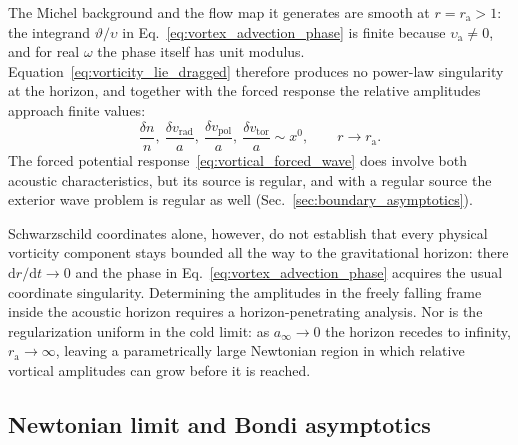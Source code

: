 \documentclass[12pt,a4paper,preprint,nopreprintline]{elsarticle}
\begin{document}
The Michel background and the flow map it generates are smooth at $r=r_{\mathrm{a}}>1$: the integrand $\vartheta/\upsilon$ in Eq.~\eqref{eq:vortex_advection_phase} is finite because $\upsilon_{\mathrm{a}}\neq0$, and for real $\omega$ the phase itself has unit modulus. Equation~\eqref{eq:vorticity_lie_dragged} therefore produces no power-law singularity at the horizon, and together with the forced response the relative amplitudes approach finite values:
\begin{equation}
    \frac{\delta n}{n},\
    \frac{\delta v_{\mathrm{rad}}}{a},\
    \frac{\delta v_{\mathrm{pol}}}{a},\
    \frac{\delta v_{\mathrm{tor}}}{a}
    \sim x^{0},
    \qquad
    r \rightarrow r_{\mathrm{a}}.
    \label{eq:michel_vortex_horizon_asymptotics}
\end{equation}
The forced potential response~\eqref{eq:vortical_forced_wave} does involve both acoustic characteristics, but its source is regular, and with a regular source the exterior wave problem is regular as well (Sec.~\ref{sec:boundary_asymptotics}).

Schwarzschild coordinates alone, however, do not establish that every physical vorticity component stays bounded all the way to the gravitational horizon: there $\mathrm{d}r/\mathrm{d}t\rightarrow0$ and the phase in Eq.~\eqref{eq:vortex_advection_phase} acquires the usual coordinate singularity. Determining the amplitudes in the freely falling frame inside the acoustic horizon requires a horizon-penetrating analysis. Nor is the regularization uniform in the cold limit: as $a_{\infty}\rightarrow0$ the horizon recedes to infinity, $r_{\mathrm{a}}\rightarrow\infty$, leaving a parametrically large Newtonian region in which relative vortical amplitudes can grow before it is reached.

\subsection{Newtonian limit and Bondi asymptotics}
\label{sec:newtonian_bondi_vortical}
\end{document}
